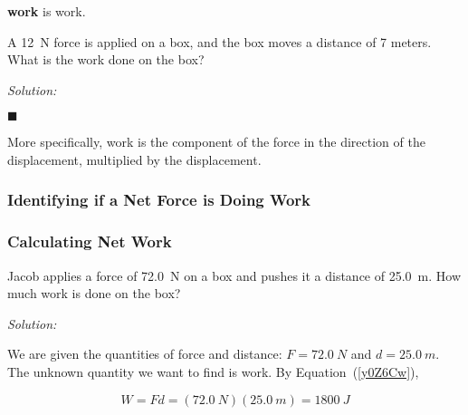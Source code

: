 \documentclass[dvipsnames]{article}
\begin{document}
\textbf{\Gls{work}} is \glsdesc{work}.

\begin{example}
A \SI{12}{N} force is applied on a box, and the box moves a distance of 7 meters. What is the work done on the box?
\end{example}


\textit{Solution:}

\hfill $\blacksquare$

More specifically, work is the component of the force in the direction of the displacement, multiplied by the displacement.

\subsubsection{Identifying if a Net Force is Doing Work}

\subsubsection{Calculating Net Work}

\begin{example} \label{HKavsZ}
Jacob applies a force of \SI{72.0}{N} on a box and pushes it a distance of \SI{25.0}{m}. How much work is done on the box?
\end{example} 

\begin{center}
\end{center}

\textit{Solution:} 

We are given the quantities of force and distance: $F = \SI{72.0}{N}$ and $d = \SI{25.0}{m}$. The unknown quantity we want to find is work. By Equation~(\ref{y0Z6Cw}), 

\begin{equation*}
    W = F d = \left(\SI{72.0}{N}\right)\left(\SI{25.0}{m}\right) = \SI{1800}{J}
\end{equation*}
\end{document}
